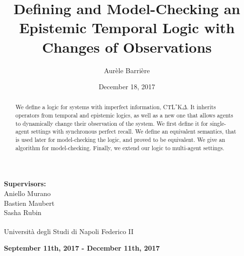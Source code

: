\documentclass{llncs2e/llncs}
\begin{document}
\setcounter{page}{0}
\pagestyle{headings}
\title{Defining and Model-Checking an Epistemic Temporal Logic with Changes of Observations}
\author{Aur\`ele Barri\`ere}
\date{December 18, 2017}
\maketitle
\hrulefill
\begin{center}
  \textbf{Supervisors: }\\
  Aniello Murano\\
  Bastien Maubert\\
  Sasha Rubin\\
  ~\\
  Universit\`a degli Studi di Napoli Federico II
\end{center}
\hrulefill
\begin{center}
  \textbf{September 11th, 2017 - December 11th, 2017}
\end{center}
\vfill
\begin{abstract}  
We define a logic for systems with imperfect information, CTL$^*$K$\Delta$. It inherits operators from temporal and epistemic logics, as well as a new one that allows agents to dynamically change their observation of the system. We first define it for single-agent settings with synchronous perfect recall. We define an equivalent semantics, that is used later for model-checking the logic, and proved to be equivalent. We give an algorithm for model-checking. Finally, we extend our logic to multi-agent settings.
\end{abstract}
\vfill
\newpage

\def\ctls{CTL$^{*}$}
\def\ctlskd{CTL$^{*}$K$\Delta$}
\def\ctlskdp{CTL$^{*}$K$\Delta\psi$}
\def\ap{AP}
\def\A{\mathit{A}}
\def\E{\mathit{E}}
\def\U{\mathit{U}}
\def\R{\mathit{R}}
\def\X{\mathit{X}}
\def\K{\mathit{K}}
\def\KP{\bar{\mathit{K}}}
\def\D#1{\Delta^{#1}}
\def\eq#1#2{\approx^{#2}_{#1}}
\def\eqh#1{\approx_{#1}}
\def\eqstate#1{\sim_{#1}}
\def\todo#1{{\color{red}#1}}
\def\iff{\ \mathit{iff}\ }
\def\UD{U_{\Delta}}
\def\UT{U_T}
\def\UDK#1{U_{\Delta #1}}
\def\UTK#1{U_{T #1}}
\def\FV{\mathit{FH}}
\def\FP{\mathit{FP}}
\def\ktree{$k$-tree}
\def\ktrees{$k$-trees}
\def\qed{\hfill$\blacksquare$}
\end{document}
